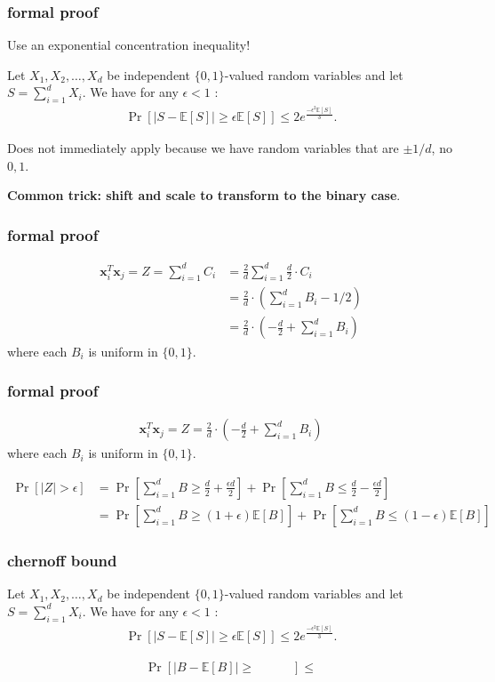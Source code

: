 \documentclass[compress]{beamer}
\newcommand{\bv}[1]{\mathbf{#1}}
\newcommand{\E}{\mathbb{E}}
\begin{document}
\begin{frame}
	\frametitle{formal proof}
	Use an exponential concentration inequality!
	\begin{theorem}
		Let $X_1,X_2,\ldots,X_d$ be independent $\{0,1\}$-valued random variables and let
		$S = \sum_{i=1}^{d} X_i$. We have for any $\epsilon < 1$ :
		\begin{align*}
			\Pr[|S - \E[S]| \geq \epsilon\E[S]] \leq 2e^{\frac{-\epsilon^2\E[S]}{3}}.
		\end{align*}
	\end{theorem} 
Does not immediately apply because we have random variables that are $\pm 1/{d}$, no $0,1$.

	\textbf{Common trick: shift and scale to transform to the binary case}.
\end{frame}

\begin{frame}[t]
	\frametitle{formal proof}

	\begin{align*}
		\bv{x}_i^T\bv{x}_j = Z = \sum_{i=1}^d C_i &= \frac{2}{d} \sum_{i=1}^d \frac{d}{2}\cdot C_i\\
		&= \frac{2}{d}\cdot \left(\sum_{i=1}^d B_i - 1/2\right)\\
		&= \frac{2}{d}\cdot \left(-\frac{d}{2} + \sum_{i=1}^d B_i \right)
	\end{align*}
	where each $B_i$ is uniform in $\{0,1\}$. 
\end{frame}



\begin{frame}[t]
		\frametitle{formal proof}
	\begin{align*}
		\bv{x}_i^T\bv{x}_j = Z = \frac{2}{d}\cdot \left(-\frac{d}{2} + \sum_{i=1}^d B_i \right)
	\end{align*}
	where each $B_i$ is uniform in $\{0,1\}$. 
	
	\begin{align*}
		\Pr[|Z| > \epsilon] &= \Pr\left[\sum_{i=1}^d B \geq \frac{d}{2} + \frac{\epsilon d}{2}\right] +\Pr\left[\sum_{i=1}^d B \leq \frac{d}{2} - \frac{\epsilon d}{2}\right ]\\
		& = \Pr\left[\sum_{i=1}^d B \geq (1+\epsilon)\E[B]\right] + \Pr\left[\sum_{i=1}^d B \leq (1-\epsilon)\E[B]\right]
	\end{align*}
\end{frame}

\begin{frame}
	\frametitle{chernoff bound}
	\begin{theorem}
		Let $X_1,X_2,\ldots,X_d$ be independent $\{0,1\}$-valued random variables and let
		$S = \sum_{i=1}^{d} X_i$. We have for any $\epsilon < 1$ :
		\begin{align*}
			\Pr[|S - \E[S]| \geq \epsilon\E[S]] \leq 2e^{\frac{-\epsilon^2\E[S]}{3}}.
		\end{align*}
	\end{theorem} 
	\begin{align*}
	\Pr[|B - \E[B]| \geq \hspace{3em}] \leq 
\end{align*}
\end{frame}
\end{document}

